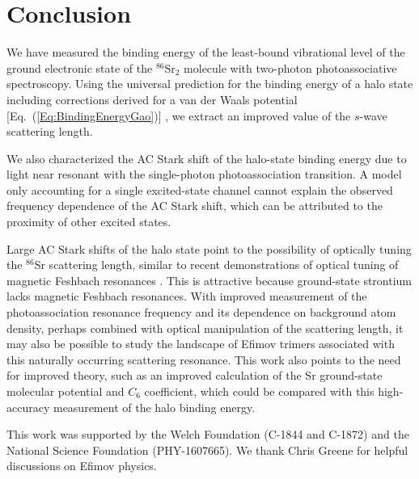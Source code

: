 \chapter{Conclusion}
\label{ch:conclusion}

We have measured the binding energy of the least-bound vibrational level of the ground electronic state of the $^{86}$Sr$_2$ molecule with two-photon photoassociative spectroscopy. Using the universal prediction for the binding energy of a halo state including corrections derived for a van der Waals potential [Eq.\ (\ref{Eq:BindingEnergyGao})] \cite{gfl93,gao01,gao04}, we extract an improved value of the $s$-wave scattering length.

We also characterized the AC Stark shift of the halo-state binding energy due to light near resonant with the single-photon photoassociation transition. A model only accounting for a single excited-state channel \cite{bju96} cannot explain the observed frequency dependence of the AC Stark shift, which can be attributed to the proximity of other excited states.

Large AC Stark shifts of the halo state point to the possibility of optically tuning the $^{86}$Sr scattering length, similar to recent demonstrations of optical tuning of magnetic Feshbach resonances \cite{blv09,chx15}. This is attractive because ground-state strontium lacks magnetic Feshbach resonances. With improved measurement of the photoassociation resonance frequency and its dependence on background atom density, perhaps combined with optical manipulation of the scattering length, it may also be possible to study the landscape of Efimov trimers associated with this naturally occurring scattering resonance. This work also points to the need for improved theory, such as an improved calculation of the Sr ground-state molecular potential and $C_6$ coefficient, which could be compared with this high-accuracy measurement of the halo binding energy.




This work was supported by the Welch Foundation (C-1844 and C-1872) and the National Science Foundation (PHY-1607665). We thank Chris Greene for helpful discussions on Efimov physics.

